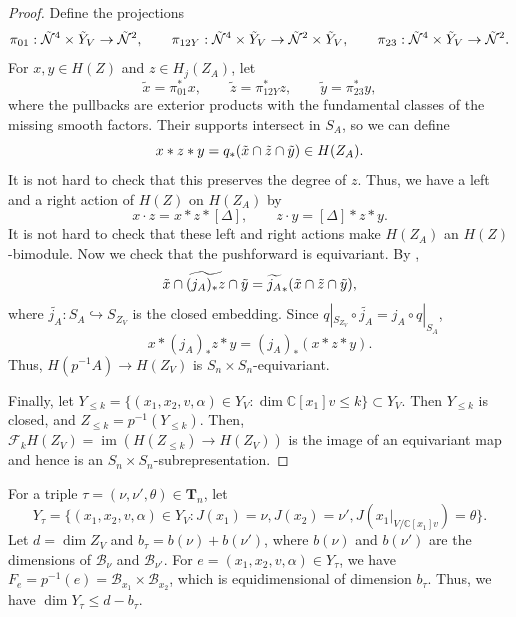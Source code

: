 \documentclass[12pt,a4paper]{article}
\theoremstyle{plain}
\theoremstyle{definition}
\theoremstyle{remark}
\newcommand{\im}{\operatorname{im}}
\newcommand{\cB}{\mathcal{B}}
\newcommand{\cN}{\mathcal{N}}
\newcommand{\bfT}{\mathbf{T}}
\newcommand{\scrF}{\mathscr{F}}
\newcommand{\CC}{\mathbb{C}}
\begin{document}
\begin{proof}
        Define the projections
        \[
        \pi_{01}: \Tilde{\cN}^4 \times \Tilde{Y}_V\rightarrow \Tilde{\cN}^2,\qquad
        \pi_{12Y}: \Tilde{\cN}^4 \times \Tilde{Y}_V\rightarrow \Tilde{\cN}^2 \times \Tilde{Y}_V,\qquad
        \pi_{23}: \Tilde{\cN}^4 \times \Tilde{Y}_V\rightarrow \Tilde{\cN}^2.
        \]
        For $x,y\in H(Z)$ and $z\in H_j(Z_A)$, let
        \[
        \widetilde x=\pi_{01}^*x,\qquad
        \widetilde z=\pi_{12Y}^*z,\qquad
        \widetilde y=\pi_{23}^*y,
        \]
        where the pullbacks are exterior products with the fundamental classes of the missing smooth factors. Their supports intersect in $S_A$, so we can define
        \[
        x\ast z\ast y = q_*(\Tilde{x} \cap \Tilde{z} \cap \Tilde{y}) \in H(Z_A).
        \]
        It is not hard to check that this preserves the degree of $z$. Thus, we have a left and a right action of $H(Z)$ on $H(Z_A)$ by
        \[
        x\cdot z = x\ast z\ast [\Delta],\qquad z\cdot y = [\Delta] \ast z\ast y.
        \]
        It is not hard to check that these left and right actions make $H(Z_A)$ an $H(Z)$-bimodule. Now we check that the pushforward is equivariant. By \cite[Section 2.6]{chriss1997representation}, 
        \[
        \Tilde{x} \cap \widetilde{(j_A)_*z} \cap \Tilde{y} = \widetilde{j_A}_*(\Tilde{x} \cap \Tilde{z} \cap \Tilde{y}),
        \]
        where $\widetilde{j_A}:S_A \hookrightarrow S_{Z_V}$ is the closed embedding. Since $q|_{S_{Z_V}}\circ\widetilde{j_A}=j_A\circ q|_{S_{A}}$,
        \[
        x\ast (j_A)_*z \ast y = (j_A)_*(x\ast z\ast y).
        \]
        Thus, $H(p^{-1}A)\to H(Z_V)$ is $S_n\times S_n$-equivariant.

        Finally, let $Y_{\leq k} = \{(x_1,x_2,v,\alpha)\in Y_V: \dim \CC[x_1]v \leq k\} \subset Y_V$. Then $Y_{\leq k}$ is closed, and $Z_{\leq k} = p^{-1}(Y_{\leq k})$. Then, $\scrF_k H(Z_V)=\im \left(H(Z_{\leq k}) \longrightarrow H(Z_V)\right)$ is the image of an equivariant map and hence is an $S_n\times S_n$-subrepresentation. 
    \end{proof}

    For a triple $\tau=(\nu,\nu',\theta)\in \bfT_n$, let
    \[
    Y_\tau=\{(x_1,x_2,v,\alpha)\in Y_V:J(x_1) = \nu,J(x_2) = \nu', J(x_1|_{V/\CC[x_1]v}) = \theta\}.
    \]
    Let $d = \dim Z_V$ and $b_\tau = b(\nu) + b(\nu')$, where $b(\nu)$ and $b(\nu')$ are the dimensions of $\cB_{\nu}$ and $\cB_{\nu'}$. For $e=(x_1,x_2,v,\alpha)\in Y_\tau$, we have $F_e=p^{-1}(e)=\cB_{x_1}\times\cB_{x_2}$, which is equidimensional of dimension $b_\tau$. Thus, we have $\dim Y_\tau\leq d-b_\tau$.
\end{document}
